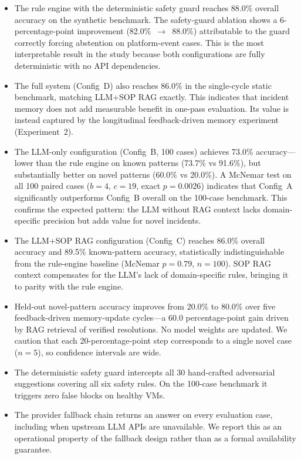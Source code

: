 \documentclass[a4paper,10pt,journal,compsoc]{IEEEtran}
\begin{document}
\begin{itemize}
\item The rule engine with the deterministic safety guard reaches
  88.0\% overall accuracy on the synthetic benchmark. The safety-guard
  ablation shows a 6-percentage-point improvement
  (82.0\%~$\to$~88.0\%) attributable to the guard correctly forcing
  abstention on platform-event cases. This is the most interpretable
  result in the study because both configurations are fully
  deterministic with no API dependencies.

\item The full system (Config~D) also reaches 86.0\% in the
  single-cycle static benchmark, matching LLM+SOP RAG exactly. This
  indicates that incident memory does not add measurable benefit in
  one-pass evaluation. Its value is instead captured by the
  longitudinal feedback-driven memory experiment (Experiment~2).

\item The LLM-only configuration (Config~B, 100 cases) achieves 73.0\%
  accuracy---lower than the rule engine on known patterns (73.7\% vs
  91.6\%), but substantially better on novel patterns (60.0\% vs
  20.0\%). A McNemar test on all 100 paired cases ($b=4$, $c=19$,
  exact $p=0.0026$) indicates that Config~A significantly outperforms
  Config~B overall on the 100-case benchmark.
  This confirms the expected pattern: the LLM without RAG context
  lacks domain-specific precision but adds value for novel incidents.

\item The LLM+SOP RAG configuration (Config~C) reaches 86.0\% overall
  accuracy and 89.5\% known-pattern accuracy, statistically
  indistinguishable from the rule-engine baseline (McNemar $p=0.79$,
  $n=100$). SOP RAG context compensates for the LLM's lack
  of domain-specific rules, bringing it to parity with the rule engine.

\item Held-out novel-pattern accuracy improves from 20.0\% to 80.0\%
  over five feedback-driven memory-update cycles---a 60.0
  percentage-point gain driven by RAG retrieval of verified resolutions.
  No model weights are updated. We caution that each 20-percentage-point
  step corresponds to a single novel case ($n = 5$), so confidence
  intervals are wide.

\item The deterministic safety guard intercepts all 30 hand-crafted
  adversarial suggestions covering all six safety rules. On the
  100-case benchmark it triggers zero false blocks on healthy VMs.

\item The provider fallback chain returns an answer on every evaluation
  case, including when upstream LLM APIs are unavailable. We report this
  as an operational property of the fallback design rather than as a
  formal availability guarantee.
\end{itemize}
\end{document}
